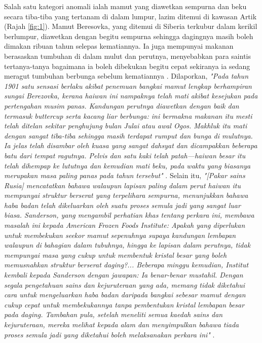 \documentclass[10pt,twocolumn,letterpaper]{article}
\begin{document}
Salah satu kategori anomali ialah mamut yang diawetkan sempurna dan beku secara tiba-tiba yang tertanam di dalam lumpur, lazim ditemui di kawasan Artik (Rajah \ref{fig:1}). Mamut Beresovka, yang ditemui di Siberia terkubur dalam kerikil berlumpur, diawetkan dengan begitu sempurna sehingga dagingnya masih boleh dimakan ribuan tahun selepas kematiannya. Ia juga mempunyai makanan berasaskan tumbuhan di dalam mulut dan perutnya, menyebabkan para saintis tertanya-tanya bagaimana ia boleh dibekukan begitu cepat sekiranya ia sedang meragut tumbuhan berbunga sebelum kematiannya \cite{17}. Dilaporkan, \textit{"Pada tahun 1901 satu sensasi berlaku akibat penemuan bangkai mamut lengkap berhampiran sungai Berezovka, kerana haiwan ini nampaknya telah mati akibat kesejukan pada pertengahan musim panas. Kandungan perutnya diawetkan dengan baik dan termasuk buttercup serta kacang liar berbunga: ini bermakna makanan itu mesti telah ditelan sekitar penghujung bulan Julai atau awal Ogos. Makhluk itu mati dengan sangat tiba-tiba sehingga masih terdapat rumput dan bunga di mulutnya. Ia jelas telah disambar oleh kuasa yang sangat dahsyat dan dicampakkan beberapa batu dari tempat ragutnya. Pelvis dan satu kaki telah patah—haiwan besar itu telah dihempap ke lututnya dan kemudian mati beku, pada waktu yang biasanya merupakan masa paling panas pada tahun tersebut"} \cite{18}. Selain itu, \textit{"[Pakar sains Rusia] mencatatkan bahawa walaupun lapisan paling dalam perut haiwan itu mempunyai struktur berserat yang terpelihara sempurna, menunjukkan bahawa haba badan telah dikeluarkan oleh suatu proses semula jadi yang sangat luar biasa. Sanderson, yang mengambil perhatian khas tentang perkara ini, membawa masalah ini kepada American Frozen Foods Institute: Apakah yang diperlukan untuk membekukan seekor mamut sepenuhnya supaya kandungan lembapan walaupun di bahagian dalam tubuhnya, hingga ke lapisan dalam perutnya, tidak mempunyai masa yang cukup untuk membentuk kristal besar yang boleh memusnahkan struktur berserat daging?... Beberapa minggu kemudian, Institut kembali kepada Sanderson dengan jawapan: Ia benar-benar mustahil. Dengan segala pengetahuan sains dan kejuruteraan yang ada, memang tidak diketahui cara untuk mengeluarkan haba badan daripada bangkai sebesar mamut dengan cukup cepat untuk membekukannya tanpa pembentukan kristal lembapan besar pada daging. Tambahan pula, setelah meneliti semua kaedah sains dan kejuruteraan, mereka melihat kepada alam dan menyimpulkan bahawa tiada proses semula jadi yang diketahui boleh melaksanakan perkara ini"} \cite{19}.
\end{document}
